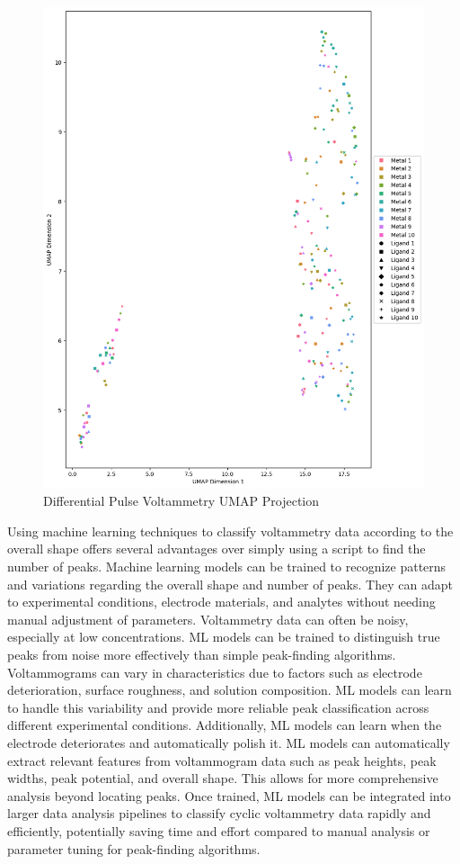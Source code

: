 \begin{figure}[h!]
  \centering
    \includegraphics[width=1.0\textwidth]{figures/dpv_umap.png}
    \caption{Differential Pulse Voltammetry UMAP Projection}
    \label{dpv-umap}
\end{figure}
Using machine learning techniques to classify voltammetry data according to the overall shape offers several advantages over simply using a script to find the number of peaks. Machine learning models can be trained to recognize patterns and variations regarding the overall shape and number of peaks. They can adapt to experimental conditions, electrode materials, and analytes without needing manual adjustment of parameters. Voltammetry data can often be noisy, especially at low concentrations. ML models can be trained to distinguish true peaks from noise more effectively than simple peak-finding algorithms. Voltammograms can vary in characteristics due to factors such as electrode deterioration, surface roughness, and solution composition. ML models can learn to handle this variability and provide more reliable peak classification across different experimental conditions. Additionally, ML models can learn when the electrode deteriorates and automatically polish it. ML models can automatically extract relevant features from voltammogram data such as peak heights, peak widths, peak potential, and overall shape. This allows for more comprehensive analysis beyond locating peaks. Once trained, ML models can be integrated into larger data analysis pipelines to classify cyclic voltammetry data rapidly and efficiently, potentially saving time and effort compared to manual analysis or parameter tuning for peak-finding algorithms.  